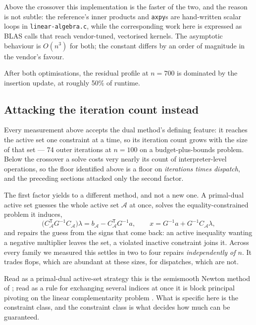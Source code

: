 \documentclass[11pt,a4paper]{article}
\theoremstyle{plain}
\theoremstyle{remark}
\newcommand{\T}{^{\mathsf{T}}}
\begin{document}
Above the crossover this implementation is the faster of the two, and the reason
is not subtle: the reference's inner products and \texttt{axpy}s are hand-written
scalar loops in \texttt{linear-algebra.c}, while the corresponding work here is
expressed as BLAS calls that reach vendor-tuned, vectorised kernels. The
asymptotic behaviour is $O(n^3)$ for both; the constant differs by an order of
magnitude in the vendor's favour.

After both optimisations, the residual profile at $n = 700$ is dominated by the
insertion update, at roughly 50\% of runtime.

\subsection{Attacking the iteration count instead}
\label{sec:pdas}

Every measurement above accepts the dual method's defining feature: it reaches the
active set one constraint at a time, so its iteration count grows with the size of
that set --- 74 outer iterations at $n = 100$ on a budget-plus-bounds problem.
Below the crossover a solve costs very nearly its count of interpreter-level
operations, so the floor identified above is a floor on \emph{iterations times
dispatch}, and the preceding sections attacked only the second factor.

The first factor yields to a different method, and not a new one. A primal-dual
active set guesses the whole active set $\mathcal{A}$ at once, solves the
equality-constrained problem it induces,
\[
  \bigl(C_\mathcal{A}\T G^{-1} C_\mathcal{A}\bigr)\lambda
    = b_\mathcal{A} - C_\mathcal{A}\T G^{-1} a,
  \qquad
  x = G^{-1}a + G^{-1} C_\mathcal{A} \lambda,
\]
and repairs the guess from the signs that come back: an active inequality wanting
a negative multiplier leaves the set, a violated inactive constraint joins it.
Across every family we measured this settles in two to four repairs
\emph{independently of $n$}. It trades flops, which are abundant at these sizes,
for dispatches, which are not.

Read as a primal-dual active-set strategy this is the semismooth Newton method of
\citet{hintermuller2002}; read as a rule for exchanging several indices at once it
is block principal pivoting on the linear complementarity problem
\citep{judice1994,murty1988,cottle1992}. What is specific
here is the constraint class, and the constraint class is what decides how much
can be guaranteed.
\end{document}
